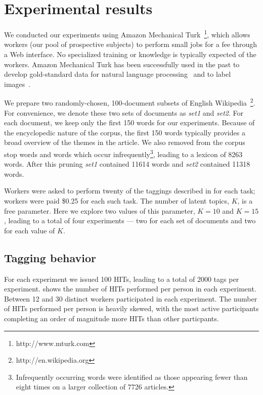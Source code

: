 \section{Experimental results}
\label{sec:experiments}

We conducted our experiments using Amazon Mechanical
Turk~\footnote{http://www.mturk.com}, which allows workers (our pool
of prospective subjects) to perform small jobs for a fee through a Web
interface.  No specialized training or knowledge is typically expected
of the workers.  Amazon Mechanical Turk has been successfully used in
the past to develop gold-standard data for natural language
processing~\cite{snow-08} and to label images~\cite{imagenet-cvpr09}.

We prepare two randomly-chosen, 100-document subsets of English
Wikipedia~\footnote{http://en.wikipedia.org}.  For convenience, we
denote these two sets of documents as \emph{set1} and \emph{set2}.
For each document, we keep only the first 150 words for our
experiments.  Because of the encyclopedic nature of the corpus, the
first 150 words typically provides a broad overview of the themes in
the article.  We also removed from the corpus stop words and words
which occur infrequently\footnote{Infrequently occurring words were
  identified as those appearing fewer than eight times on a larger
  collection of 7726 articles.}, leading to a lexicon of 8263 words.
After this pruning \emph{set1} contained 11614 words and \emph{set2}
contained 11318 words.

Workers were asked to perform twenty of the taggings described in
 for each task; workers were paid \$0.25 for each
such task.  The number of latent topics, $K$, is a free parameter.
Here we explore two values of this parameter, $K=10$ and $K=15$,
leading to a total of four experiments --- two for each set of
documents and two for each value of $K$.

\subsection{Tagging behavior}
For each experiment we issued 100 HITs, leading to a total of 2000
tags per experiment.   shows the number of HITs
performed per person in each experiment.  Between 12 and 30 distinct
workers participated in each experiment.  The number of HITs performed
per person is heavily skewed, with the most active participants
completing an order of magnitude more HITs than other particpants.

